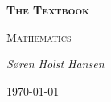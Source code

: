 \documentclass[textbook.tex]{subfiles}
\begin{document}
\begin{titlepage}
	\centering
	{\scshape\Huge\bfseries The Textbook \par}
	\vspace{1cm}
	{\scshape\Large Mathematics \par}
	\vspace{1.5cm}
	{\Large\itshape S\o ren Holst Hansen \par}

	\vfill

	{\large \today\par}
\end{titlepage}
\end{document}

